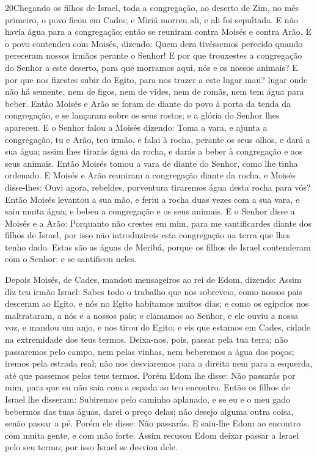 \lettrine{20} Chegando os filhos de Israel, toda a
congregação, ao deserto de Zim, no mês primeiro, o povo ficou em
Cades; e Miriã morreu ali, e ali foi sepultada. E não havia água
para a congregação; então se reuniram contra Moisés e contra Arão.
E o povo contendeu com Moisés, dizendo: Quem dera tivéssemos
perecido quando pereceram nossos irmãos perante o Senhor! E por
que trouxestes a congregação do Senhor a este deserto, para que
morramos aqui, nós e os nossos animais? E por que nos fizestes
subir do Egito, para nos trazer a este lugar mau? lugar onde não há
semente, nem de figos, nem de vides, nem de romãs, nem tem água para
beber. Então Moisés e Arão se foram de diante do povo à porta da
tenda da congregação, e se lançaram sobre os seus rostos; e a glória
do Senhor lhes apareceu. E o Senhor falou a Moisés dizendo:
Toma a vara, e ajunta a congregação, tu e Arão, teu irmão, e
falai à rocha, perante os seus olhos, e dará a sua água; assim lhes
tirarás água da rocha, e darás a beber à congregação e aos seus
animais. Então Moisés tomou a vara de diante do Senhor, como lhe
tinha ordenado. E Moisés e Arão reuniram a congregação diante
da rocha, e Moisés disse-lhes: Ouvi agora, rebeldes, porventura
tiraremos água desta rocha para vós? Então Moisés levantou a
sua mão, e feriu a rocha duas vezes com a sua vara, e saiu muita
água; e bebeu a congregação e os seus animais. E o Senhor
disse a Moisés e a Arão: Porquanto não crestes em mim, para me
santificardes diante dos filhos de Israel, por isso não
introduzireis esta congregação na terra que lhes tenho dado.
Estas são as águas de Meribá, porque os filhos de Israel
contenderam com o Senhor; e se santificou neles.

Depois Moisés, de Cades, mandou mensageiros ao rei de Edom,
dizendo: Assim diz teu irmão Israel: Sabes todo o trabalho que nos
sobreveio, como nossos pais desceram ao Egito, e nós no Egito
habitamos muitos dias; e como os egípcios nos maltrataram, a nós e a
nossos pais; e clamamos ao Senhor, e ele ouviu a nossa voz, e
mandou um anjo, e nos tirou do Egito; e eis que estamos em Cades,
cidade na extremidade dos teus termos. Deixa-nos, pois,
passar pela tua terra; não passaremos pelo campo, nem pelas vinhas,
nem beberemos a água dos poços; iremos pela estrada real; não nos
desviaremos para a direita nem para a esquerda, até que passemos
pelos teus termos. Porém Edom lhe disse: Não passarás por
mim, para que eu não saia com a espada ao teu encontro. Então
os filhos de Israel lhe disseram: Subiremos pelo caminho aplanado, e
se eu e o meu gado bebermos das tuas águas, darei o preço delas; não
desejo alguma outra coisa, senão passar a pé. Porém ele
disse: Não passarás. E saiu-lhe Edom ao encontro com muita gente, e
com mão forte. Assim recusou Edom deixar passar a Israel pelo
seu termo; por isso Israel se desviou dele.

